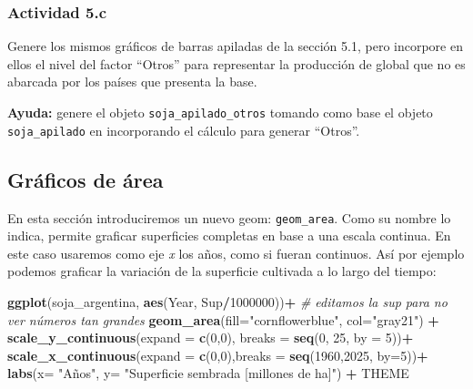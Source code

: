 \documentclass[
]{article}
\newenvironment{Shaded}{\begin{snugshade}}{\end{snugshade}}
\newcommand{\AttributeTok}[1]{\textcolor[rgb]{0.13,0.29,0.53}{#1}}
\newcommand{\CommentTok}[1]{\textcolor[rgb]{0.56,0.35,0.01}{\textit{#1}}}
\newcommand{\DecValTok}[1]{\textcolor[rgb]{0.00,0.00,0.81}{#1}}
\newcommand{\FunctionTok}[1]{\textcolor[rgb]{0.13,0.29,0.53}{\textbf{#1}}}
\newcommand{\NormalTok}[1]{#1}
\newcommand{\SpecialCharTok}[1]{\textcolor[rgb]{0.81,0.36,0.00}{\textbf{#1}}}
\newcommand{\StringTok}[1]{\textcolor[rgb]{0.31,0.60,0.02}{#1}}
\begin{document}
\subsubsection{Actividad 5.c}\label{actividad-5.c}

Genere los mismos gráficos de barras apiladas de la sección 5.1, pero
incorpore en ellos el nivel del factor ``Otros'' para representar la
producción de global que no es abarcada por los países que presenta la
base.

\textbf{Ayuda:} genere el objeto \texttt{soja\_apilado\_otros} tomando
como base el objeto \texttt{soja\_apilado} en incorporando el cálculo
para generar ``Otros''.

\subsection{Gráficos de área}\label{gruxe1ficos-de-uxe1rea}

En esta sección introduciremos un nuevo geom: \texttt{geom\_area}. Como
su nombre lo indica, permite graficar superficies completas en base a
una escala continua. En este caso usaremos como eje \emph{x} los años,
como si fueran continuos. Así por ejemplo podemos graficar la variación
de la superficie cultivada a lo largo del tiempo:

\begin{Shaded}
\begin{Highlighting}[]
\FunctionTok{ggplot}\NormalTok{(soja\_argentina, }\FunctionTok{aes}\NormalTok{(Year, Sup}\SpecialCharTok{/}\DecValTok{1000000}\NormalTok{))}\SpecialCharTok{+} \CommentTok{\# editamos la sup para no ver números tan grandes   }
  \FunctionTok{geom\_area}\NormalTok{(}\AttributeTok{fill=}\StringTok{"cornflowerblue"}\NormalTok{, }\AttributeTok{col=}\StringTok{"gray21"}\NormalTok{) }\SpecialCharTok{+}
  \FunctionTok{scale\_y\_continuous}\NormalTok{(}\AttributeTok{expand =} \FunctionTok{c}\NormalTok{(}\DecValTok{0}\NormalTok{,}\DecValTok{0}\NormalTok{),}
          \AttributeTok{breaks =} \FunctionTok{seq}\NormalTok{(}\DecValTok{0}\NormalTok{, }\DecValTok{25}\NormalTok{, }\AttributeTok{by =} \DecValTok{5}\NormalTok{))}\SpecialCharTok{+}
  \FunctionTok{scale\_x\_continuous}\NormalTok{(}\AttributeTok{expand =} \FunctionTok{c}\NormalTok{(}\DecValTok{0}\NormalTok{,}\DecValTok{0}\NormalTok{),}\AttributeTok{breaks =} \FunctionTok{seq}\NormalTok{(}\DecValTok{1960}\NormalTok{,}\DecValTok{2025}\NormalTok{, }\AttributeTok{by=}\DecValTok{5}\NormalTok{))}\SpecialCharTok{+}   
  \FunctionTok{labs}\NormalTok{(}\AttributeTok{x=} \StringTok{"Años"}\NormalTok{,}
       \AttributeTok{y=} \StringTok{"Superficie sembrada [millones de ha]"}\NormalTok{) }\SpecialCharTok{+}\NormalTok{   THEME}
\end{Highlighting}
\end{Shaded}
\end{document}
